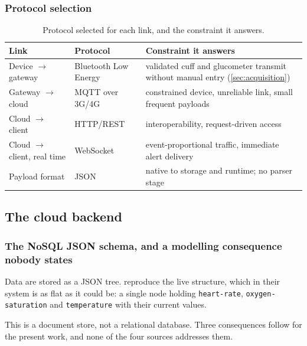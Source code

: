 \documentclass[12pt,a4paper,oneside]{report}
\begin{document}
\subsubsection{Protocol selection}

\begin{table}[htbp]
\centering\small
\caption{Protocol selected for each link, and the constraint it answers.}\label{tab:protocol-selection}
\begin{tabularx}{\textwidth}{@{}>{\raggedright\arraybackslash}p{3.5cm} >{\raggedright\arraybackslash}p{3.2cm} X@{}}
\toprule
\textbf{Link} & \textbf{Protocol} & \textbf{Constraint it answers} \\
\midrule
Device $\rightarrow$ gateway & Bluetooth Low Energy & validated cuff and glucometer transmit without manual entry (\cref{sec:acquisition}) \\
Gateway $\rightarrow$ cloud & MQTT over 3G/4G & constrained device, unreliable link, small frequent payloads \\
Cloud $\rightarrow$ client & HTTP/REST & interoperability, request-driven access \\
Cloud $\rightarrow$ client, real time & WebSocket & event-proportional traffic, immediate alert delivery \\
Payload format & JSON & native to storage and runtime; no parser stage \\
\bottomrule
\end{tabularx}
\end{table}

\subsection{The cloud backend}\label{sec:backend-req}


\subsubsection{The NoSQL JSON schema, and a modelling consequence nobody states}\label{sec:schema}

Data are stored as a JSON tree. \Textcite{efendi2025} reproduce the live structure, which in their system is as flat as it could be: a single node holding \texttt{heart-rate}, \texttt{oxygen-saturation} and \texttt{temperature} with their current values.

This is a document store, not a relational database. Three consequences follow for the present work, and none of the four sources addresses them.
\end{document}

